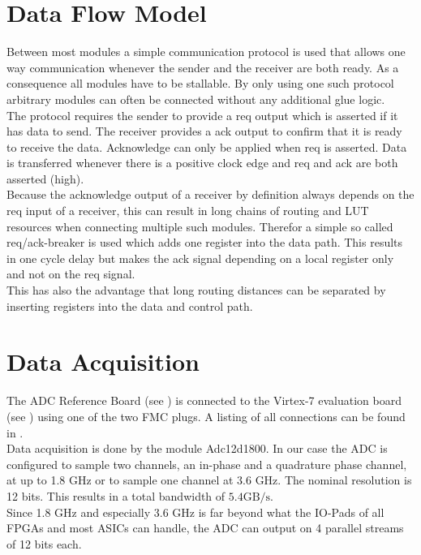 \section{Data Flow Model}
\label{sec:fpga_reqack}
Between most modules a simple communication protocol is used that allows
one way communication whenever the sender and the receiver are both
ready. As a consequence all modules have to be stallable. By only using
one such protocol arbitrary modules can often be connected
without any additional glue logic. \\

The protocol requires the sender to provide a \acrfull{req} output which
is asserted if it has data to send. The receiver provides a \acrfull{ack}
output to confirm that it is ready to receive the data.
Acknowledge can only be applied when \gls{req} is asserted.
Data is transferred whenever there is a positive clock edge and
\gls{req} and \gls{ack} are both asserted (high). \\

Because the acknowledge output of a receiver by definition always depends on the
\gls{req} input of a receiver, this can result in long chains of routing and
\gls{LUT} resources when connecting multiple such modules.
Therefor a simple so called \gls{req}/\gls{ack}-breaker is used which adds one
register into the data path. This results in one cycle delay but makes the
\gls{ack} signal depending on a local register only and not on the
\gls{req} signal. \\

This has also the advantage that long routing distances can be separated by
inserting registers into the data and control path. \\

\section{Data Acquisition}
\label{sec:fpga_adc}

The \gls{ADC} Reference Board (see ) is connected
to the Virtex-7 evaluation board (see )
using one of the two \gls{FMC} plugs.
A listing of all connections can be found in . \\

Data acquisition is done by the module Adc12d1800. In our case the ADC is
configured to sample two channels, an in-phase and a quadrature phase channel,
at up to 1.8 GHz or to sample one channel at 3.6 GHz.
The nominal resolution is 12 bits. This results in a total bandwidth of
$5.4 \text{GB}/\text{s}$. \\
Since 1.8 GHz and especially 3.6 GHz is far beyond what the IO-Pads of all
\glspl{FPGA}  and most \glspl{ASIC} can handle,
the ADC can output on 4 parallel streams of 12 bits each. \\

